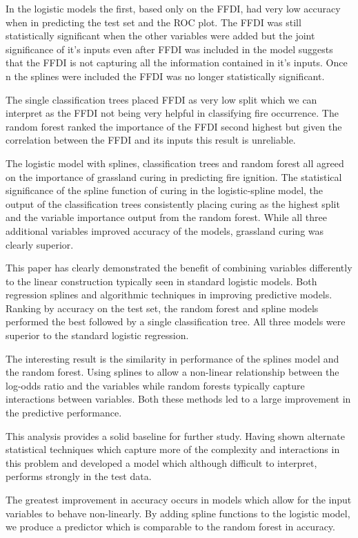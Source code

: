 \documentclass[11pt,a4paper]{article}
\begin{document}
In the logistic models the first, based only on the FFDI, had very low accuracy when  in predicting the test set and the ROC plot. The FFDI was still statistically significant when the other variables were added but the joint significance of it's inputs even after FFDI was included in the model suggests that the FFDI is not capturing all the information contained in it's inputs. Once n the splines were included the FFDI was no longer statistically significant.

The single classification trees placed FFDI as very low split which we can interpret as the FFDI not being very helpful in classifying fire occurrence. The random forest ranked the importance of the FFDI second highest but given the correlation between the FFDI and its inputs this result is unreliable.

The logistic model with splines, classification trees and random forest all agreed on the importance of grassland curing in predicting fire ignition. The statistical significance of the spline function of curing in the logistic-spline model, the output of the classification trees consistently placing curing as the highest split and the variable importance output from the random forest. While all three additional variables improved accuracy of the models, grassland curing was clearly superior.

This paper has clearly demonstrated the benefit of combining variables differently to the linear construction typically seen in standard logistic models. Both regression splines and algorithmic techniques in improving predictive models. Ranking by accuracy on the test set, the random forest and spline models performed the best followed by a single classification tree. All three models were superior to the standard logistic regression.

The interesting result is the similarity in performance of the splines model and the random forest. Using splines to allow a non-linear relationship between the log-odds ratio and the variables while random forests typically capture interactions between variables. Both these methods led to a large improvement in the predictive performance.

This analysis provides a solid baseline for further study. Having shown alternate statistical techniques which capture more of the complexity and interactions in this problem and developed a model which although difficult to interpret, performs strongly in the test data.


The greatest improvement in accuracy occurs in models which allow for the input variables to behave non-linearly. By adding spline functions to the logistic model, we produce a predictor which is comparable to the random forest in accuracy.
\end{document}
